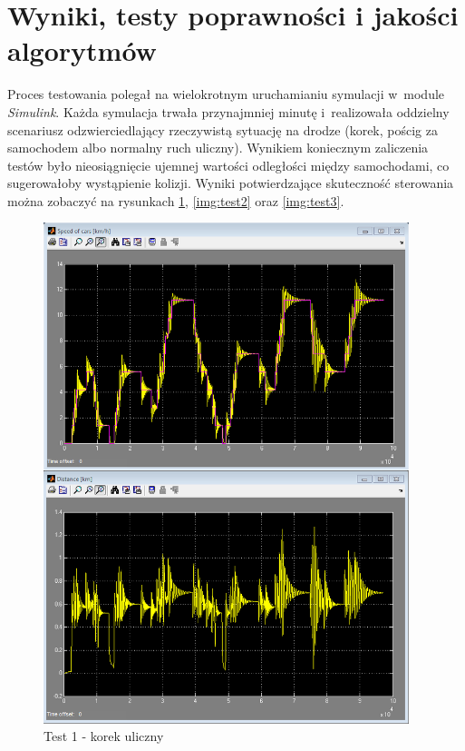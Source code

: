 \documentclass[11pt,a4paper]{article}
\begin{document}
\section{Wyniki, testy poprawności i jakości algorytmów}
Proces testowania polegał na wielokrotnym uruchamianiu symulacji w~module \emph{Simulink}. Każda symulacja trwała przynajmniej minutę i~realizowała oddzielny scenariusz odzwierciedlający rzeczywistą sytuację na drodze (korek, pościg za samochodem albo normalny ruch uliczny). Wynikiem koniecznym zaliczenia testów było nieosiągnięcie ujemnej wartości odległości między samochodami, co sugerowałoby wystąpienie kolizji. Wyniki potwierdzające skuteczność sterowania można zobaczyć na rysunkach \ref{img:test1}, \ref{img:test2} oraz \ref{img:test3}.

\begin{figure}
\centering
\includegraphics[width=0.95\textwidth]{traffic.png}
\caption{Test 1 - korek uliczny} 
\label{img:test1}
\end{figure}
\end{document}
